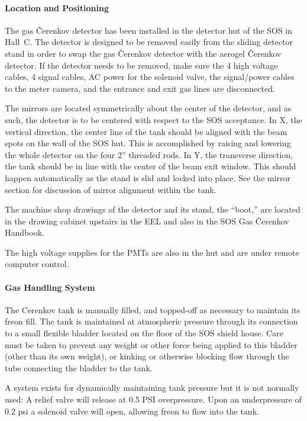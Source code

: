 \paragraph{Location and Positioning}

	 The gas \v{C}erenkov detector has been installed in the detector
hut of the SOS in Hall~C. The detector is designed to be removed easily
from the sliding detector stand in order to swap the gas \v{C}erenkov
detector with the aerogel \v{C}erenkov detector.  If the detector needs to
be removed, make sure the 4 high voltage cables, 4 signal cables, AC
power for the solenoid valve, the signal/power cables to the meter
camera, and the entrance and exit gas lines are disconnected.

	The mirrors are located symmetrically about the center of the
detector, and as such, the detector is to be centered with respect to
the SOS acceptance.  In X, the vertical direction, the center line of
the tank should be aligned with the beam spots on the wall of the SOS
hut.  This is accomplished by raising and lowering the whole detector
on the four 2'' threaded rods.  In Y, the transverse direction, the
tank should be in line with the center of the beam exit window.  This
should happen automatically as the stand is slid and locked into
place.  See the mirror section for discussion of mirror alignment
within the tank.

	The machine shop drawings of the detector and its stand, the
``boot,'' are located in the drawing cabinet upstairs in the EEL and
also in the SOS Gas \v{C}erenkov Handbook.

	The high voltage supplies for the PMTs are also in the hut and
are under remote computer control.

\paragraph{Gas Handling System}

The Cerenkov tank is manually filled, and topped-off as necessary to
maintain its freon fill.
The tank is maintained at atmospheric pressure through its
connection to a small flexible bladder located on the floor of the
SOS shield house. Care must be taken to prevent any weight or other
force being applied to this bladder (other than its own weight), or
kinking or otherwise blocking flow through the tube connecting the
bladder to the tank.

	A system exists for dynamically maintaining tank pressure but it 
is not normally used:  A relief valve will release at 0.5 PSI
overpressure. Upon an underpressure of 0.2 psi a solenoid valve 
will open, allowing freon to flow
into the tank.  

